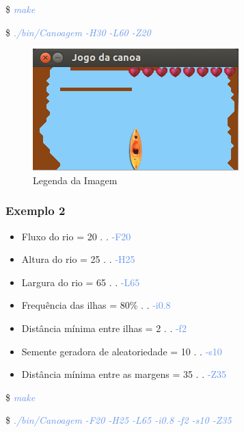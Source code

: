 \documentclass[a4paper,12pt]{article}
\begin{document}
    \$ \textcolor{CornflowerBlue}{\textit{make}}
    
    \$ \textcolor{CornflowerBlue}{\textit{./bin/Canoagem -H30 -L60 -Z20}}
  
    \bigskip
    
\begin{figure}[h]
     \includegraphics[scale=1]{im1.png}
     \caption{Legenda da Imagem}
\end{figure}
  
  \newpage %
    \subsubsection{\textcolor{NavyBlue}{Exemplo 2}}
    
    \begin{itemize}
    \bigskip
    
    \item Fluxo do rio = 20  . . \textcolor{CornflowerBlue}{-F20}  
    \item Altura do rio = 25  . . \textcolor{CornflowerBlue}{-H25}
    \item Largura do rio = 65  . . \textcolor{CornflowerBlue}{-L65}
    \item Frequência das ilhas = 80\%  . . \textcolor{CornflowerBlue}{-i0.8}
    \item Distância mínima entre ilhas = 2  . . \textcolor{CornflowerBlue}{-f2}
    \item Semente geradora de aleatoriedade = 10  . . \textcolor{CornflowerBlue}{-s10}
    \item Distância mínima entre as margens = 35  . . \textcolor{CornflowerBlue}{-Z35}
    
    \end{itemize}  
    \bigskip
    
    \$ \textcolor{CornflowerBlue}{\textit{make}}
    
    \$ \textcolor{CornflowerBlue}{\textit{./bin/Canoagem -F20 -H25 -L65 -i0.8 -f2 -s10 -Z35}}
    
\end{document}

